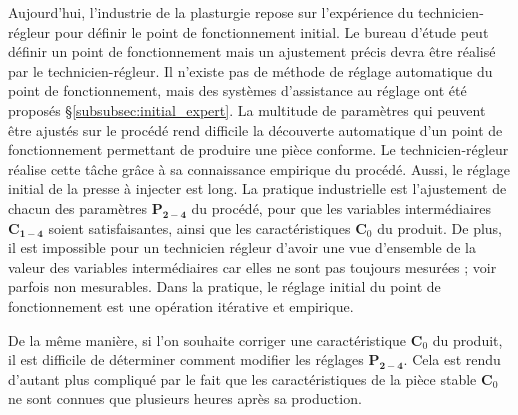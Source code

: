 Aujourd'hui, l'industrie de la plasturgie repose sur l'expérience du technicien-régleur pour définir le point de fonctionnement initial.
Le bureau d'étude peut définir un point de fonctionnement mais un ajustement précis devra être réalisé par le technicien-régleur.
Il n'existe pas de méthode de réglage automatique du point de fonctionnement, mais des systèmes d'assistance au réglage ont été proposés §\ref{subsubsec:initial_expert}.
La multitude de paramètres qui peuvent être ajustés sur le procédé rend difficile la découverte automatique d'un point de fonctionnement permettant de produire une pièce conforme.
Le technicien-régleur réalise cette tâche grâce à sa connaissance empirique du procédé.
Aussi, le réglage initial de la presse à injecter est long.
La pratique industrielle est l'ajustement de chacun des paramètres $\boldsymbol{P_{2-4}}$ du procédé, pour que les variables intermédiaires $\boldsymbol{C_{1-4}}$ soient satisfaisantes, ainsi que les caractéristiques $\boldsymbol{C}_0$ du produit.
De plus, il est impossible pour un technicien régleur d'avoir une vue d'ensemble de la valeur des variables intermédiaires car elles ne sont pas toujours mesurées ; voir parfois non mesurables.
Dans la pratique, le réglage initial du point de fonctionnement est une opération itérative et empirique.

De la même manière, si l'on souhaite corriger une caractéristique $\boldsymbol{C}_0$ du produit, il est difficile de déterminer comment modifier les réglages $\boldsymbol{P_{2-4}}$.
Cela est rendu d'autant plus compliqué par le fait que les caractéristiques de la pièce stable $\boldsymbol{C}_0$ ne sont connues que plusieurs heures après sa production.


